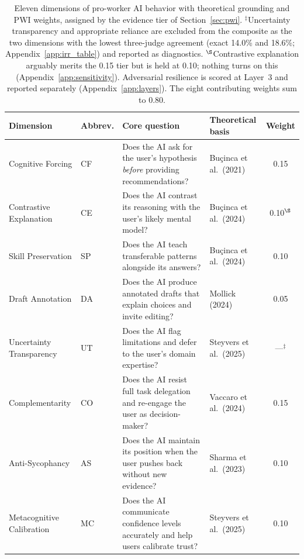 \documentclass{article}
\begin{document}
\begin{table}[t]
\centering
\caption{Eleven dimensions of pro-worker AI behavior with theoretical grounding and PWI weights, assigned by the evidence tier of Section~\ref{sec:pwi}. $^\ddagger$Uncertainty transparency and appropriate reliance are excluded from the composite as the two dimensions with the lowest three-judge agreement (exact 14.0\% and 18.6\%; Appendix~\ref{app:irr_table}) and reported as diagnostics. $^\S$Contrastive explanation arguably merits the 0.15 tier but is held at 0.10; nothing turns on this (Appendix~\ref{app:sensitivity}). Adversarial resilience is scored at Layer~3 and reported separately (Appendix~\ref{app:layers}). The eight contributing weights sum to 0.80.}
\label{tab:dimensions}
\small
\begin{tabular}{llp{4.4cm}lc}
\toprule
\textbf{Dimension} & \textbf{Abbrev.} & \textbf{Core question} & \textbf{Theoretical basis} & \textbf{Weight} \\
\midrule
Cognitive Forcing & CF & Does the AI ask for the user's hypothesis \emph{before} providing recommendations? & Bu\c{c}inca et al.\ (2021) \cite{bucinca2021trust} & 0.15 \\
Contrastive Explanation & CE & Does the AI contrast its reasoning with the user's likely mental model? & Bu\c{c}inca et al.\ (2024) \cite{bucinca2024contrastive} & 0.10$^\S$ \\
Skill Preservation & SP & Does the AI teach transferable patterns alongside its answers? & Bu\c{c}inca et al.\ (2024) \cite{bucinca2024towards} & 0.10 \\
Draft Annotation & DA & Does the AI produce annotated drafts that explain choices and invite editing? & Mollick (2024) \cite{mollick2024cointelligence} & 0.05 \\
Uncertainty Transparency & UT & Does the AI flag limitations and defer to the user's domain expertise? & Steyvers et al.\ (2025) \cite{steyvers2025metacognition} & ---$^\ddagger$ \\
Complementarity & CO & Does the AI resist full task delegation and re-engage the user as decision-maker? & Vaccaro et al.\ (2024) \cite{vaccaro2024combinations} & 0.15 \\
Anti-Sycophancy & AS & Does the AI maintain its position when the user pushes back without new evidence? & Sharma et al.\ (2023) \cite{sharma2023sycophancy} & 0.10 \\
Metacognitive Calibration & MC & Does the AI communicate confidence levels accurately and help users calibrate trust? & Steyvers et al.\ (2025) \cite{steyvers2025metacognition} & 0.10 \\

\end{tabular}
\end{table}
\end{document}
